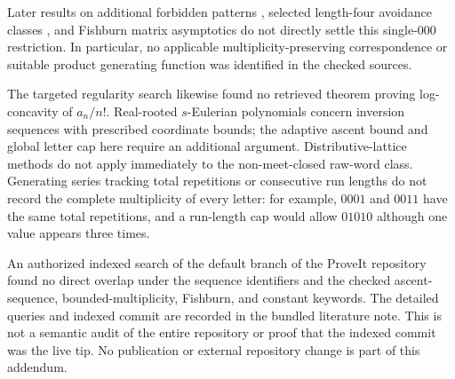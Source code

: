 \documentclass[11pt,letterpaper]{article}
\theoremstyle{remark}
\begin{document}
Later results on additional forbidden patterns \cite{CallanMansour}, selected length-four avoidance classes \cite{LiuKitaevZhang}, and Fishburn matrix asymptotics \cite{HwangJin} do not directly settle this single-$000$ restriction. In particular, no applicable multiplicity-preserving correspondence or suitable product generating function was identified in the checked sources.

The targeted regularity search likewise found no retrieved theorem proving log-concavity of $a_n/n!$. Real-rooted $s$-Eulerian polynomials \cite{SavageVisontai} concern inversion sequences with prescribed coordinate bounds; the adaptive ascent bound and global letter cap here require an additional argument. Distributive-lattice methods \cite{LiangSagan} do not apply immediately to the non-meet-closed raw-word class. Generating series tracking total repetitions \cite{JinSchlosser} or consecutive run lengths \cite{Dukes} do not record the complete multiplicity of every letter: for example, $0001$ and $0011$ have the same total repetitions, and a run-length cap would allow $01010$ although one value appears three times.

An authorized indexed search of the default branch of the ProveIt repository \cite{ProveIt} found no direct overlap under the sequence identifiers and the checked ascent-sequence, bounded-multiplicity, Fishburn, and constant keywords. The detailed queries and indexed commit are recorded in the bundled literature note. This is not a semantic audit of the entire repository or proof that the indexed commit was the live tip. No publication or external repository change is part of this addendum.
\end{document}
